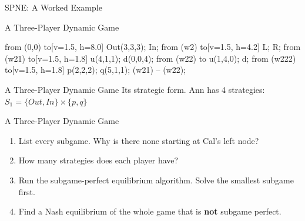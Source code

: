 
\begin{frame}[standout]
SPNE: A Worked Example
\end{frame}

\begin{frame}{A Three-Player Dynamic Game}
\centering
\begin{gametree}[player names={Ann, Ben, Cal}, scale=0.66]
  \branch[player=1, root=w, label=90] from (0,0) to[v=1.5, h=8.0] {Out(3,3,3); In};
  \branch[player=2, label=0] from (w2) to[v=1.5, h=4.2] {L; R};
  \branch[player=3, label=none] from (w21) to[v=1.5, h=1.8] {u(4,1,1); d(0,0,4)};
  \branch[label=none] from (w22) to {u(1,4,0); d};
  \branch[player=1, label=0] from (w222) to[v=1.5, h=1.8] {p(2,2,2); q(5,1,1)};
  \informset[player=3] (w21) -- (w22);
\end{gametree}
\vspace{-0.15in}
\end{frame}

\begin{frame}{A Three-Player Dynamic Game}
Its strategic form. Ann has 4 strategies: $S_1=\{Out,In\}\times\{p,q\}$
\bsk
\centering
{\scriptsize
\begin{matrixgame}[top={L, R}, left={(Out\,p), (Out\,q), (In\,p), (In\,q)}, bottom={Cal: u, Cal: d}, player names={Ann, Ben, Cal}]
\end{matrixgame}}
\vspace{-0.15in}
\end{frame}

\begin{frame}{A Three-Player Dynamic Game}
\begin{enumerate}
    \item List every subgame. Why is there none starting at Cal's left node? \vspace{0.3in}
    \item How many strategies does each player have? \vspace{0.3in}
    \item Run the subgame-perfect equilibrium algorithm. Solve the smallest
      subgame first. \vspace{0.35in}
    \item Find a Nash equilibrium of the whole game that is \textbf{not}
      subgame perfect. \vspace{0.3in}
\end{enumerate}
\end{frame}

